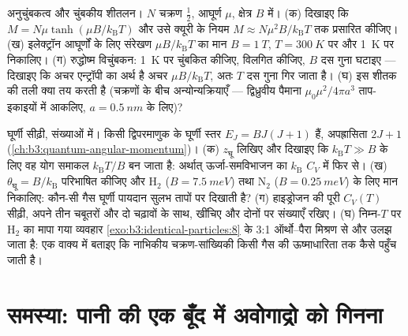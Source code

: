 \begin{exercise}[$\star\star\star$]\label{exo:b3:canonical-ensemble:11}
अनुचुंबकत्व और चुंबकीय शीतलन। $N$ चक्रण $\tfrac12$, आघूर्ण
$\mu$, क्षेत्र $B$ में। (क) दिखाइए कि $M = N\mu\tanh(\mu B/k_{\text{B}}T)$
और उसे क्यूरी के नियम $M \approx N\mu^2B/k_{\text{B}}T$ तक प्रसारित
कीजिए। (ख) इलेक्ट्रॉन आघूर्णों के लिए संरेखण $\mu B/k_{\text{B}}T$ का
मान $B = \qty{1}{T}$, $T = \qty{300}{K}$ पर और \qty{1}{K} पर निकालिए। (ग)
रुद्धोष्म विचुंबकन: \qty{1}{K} पर चुंबकित कीजिए, विलगित कीजिए,
$B$ दस गुना घटाइए --- दिखाइए कि अचर एन्ट्रॉपी का अर्थ है अचर
$\mu B/k_{\text{B}}T$, अतः $T$ दस गुना गिर जाता है। (घ) इस शीतक की
तली क्या तय करती है (चक्रणों के बीच अन्योन्यक्रियाएँ ---
द्विध्रुवीय पैमाना $\mu_0\mu^2/4\pi a^3$ ताप-इकाइयों में आकलिए, $a =
\qty{0.5}{nm}$ के लिए)?
\end{exercise}

\begin{exercise}[$\star\star\star$]\label{exo:b3:canonical-ensemble:12}
घूर्णी सीढ़ी, संख्याओं में। किसी द्विपरमाणुक के घूर्णी
स्तर $E_J = BJ(J+1)$ हैं, अपह्रासिता $2J + 1$
(\cref{ch:b3:quantum-angular-momentum})। (क) $z_{\text{घू}}$ लिखिए
और दिखाइए कि $k_{\text{B}}T \gg B$ के लिए वह योग
समाकल $k_{\text{B}}T/B$ बन जाता है: अर्थात् ऊर्जा-समविभाजन का $k_{\text{B}}$
$C_V$ में फिर से। (ख) $\theta_{\text{घू}} =
B/k_{\text{B}}$ परिभाषित कीजिए और H$_2$ ($B = \qty{7.5}{meV}$) तथा
N$_2$ ($B = \qty{0.25}{meV}$) के लिए मान निकालिए: कौन-सी गैस घूर्णी
पायदान सुलभ तापों पर दिखाती है? (ग) हाइड्रोजन की पूरी $C_V(T)$
सीढ़ी, अपने तीन चबूतरों और दो चढ़ावों के साथ, खींचिए और दोनों पर
संख्याएँ रखिए। (घ) निम्न-$T$ पर H$_2$ का मापा गया व्यवहार
\cref{exo:b3:identical-particles:8} के 3:1 ऑर्थो--पैरा मिश्रण से और
उलझ जाता है: एक वाक्य में बताइए कि नाभिकीय चक्रण-सांख्यिकी किसी गैस
की ऊष्माधारिता तक कैसे पहुँच जाती है।
\end{exercise}

\section{समस्या: पानी की एक बूँद में अवोगाद्रो को गिनना}

